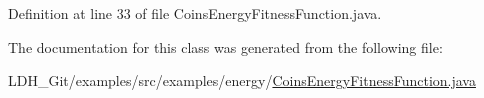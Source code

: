 Definition at line 33 of file Coins\-Energy\-Fitness\-Function.\-java.



The documentation for this class was generated from the following file\-:\begin{DoxyCompactItemize}
\item 
L\-D\-H\-\_\-\-Git/examples/src/examples/energy/\hyperlink{_coins_energy_fitness_function_8java}{Coins\-Energy\-Fitness\-Function.\-java}\end{DoxyCompactItemize}
